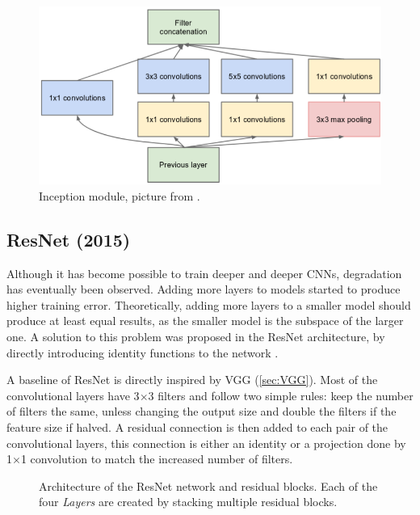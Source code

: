 \begin{figure}
    \includegraphics[width=\textwidth]{img/inception}
    \caption{Inception module, picture from \cite[figure 2]{bib:googlenet}.}
    \label{fig:incept_mod}
\end{figure}

\subsection*{ResNet (2015)}
\label{sec:resnet}

Although it has become possible to train deeper and deeper CNNs, degradation has eventually been observed. Adding more layers to models started to produce higher training error. Theoretically, adding more layers to a smaller model should produce at least equal results, as the smaller model is the subspace of the larger one. A solution to this problem was proposed in the ResNet architecture, by directly introducing identity functions to the network \cite{bib:resnet}.  

A baseline of ResNet is directly inspired by VGG (\cref{sec:VGG}). Most of the convolutional layers have 3$\times$3 filters and follow two simple rules: keep the number of filters the same, unless changing the output size and double the filters if the feature size if halved. A residual connection is then added to each pair of the convolutional layers, this connection is either an identity or a projection done by 1$\times$1 convolution to match the increased number of filters. 

\begin{figure}
    \resnetArch
    \caption{Architecture of the ResNet network and residual blocks. Each of the four \textit{Layers} are created by stacking multiple residual blocks.}
    \label{fig:resnet_arch}
\end{figure}

